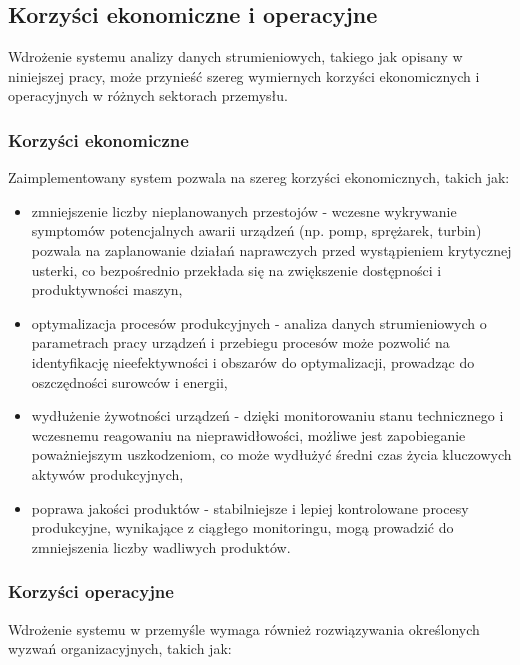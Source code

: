 \subsection{Korzyści ekonomiczne i operacyjne}
\label{subsec:korzysci}

Wdrożenie systemu analizy danych strumieniowych, takiego jak opisany w niniejszej pracy, może przynieść szereg wymiernych korzyści ekonomicznych i operacyjnych w różnych sektorach przemysłu.

\subsubsection{Korzyści ekonomiczne}
\label{subsubsec:korzysci_ekonomiczne}

Zaimplementowany system pozwala na szereg korzyści ekonomicznych, takich jak:

\vspace{0.3em}

\begin{itemize}
    \item zmniejszenie liczby nieplanowanych przestojów - wczesne wykrywanie symptomów potencjalnych awarii urządzeń (np. pomp, sprężarek, turbin) pozwala na zaplanowanie działań naprawczych przed wystąpieniem krytycznej usterki, co bezpośrednio przekłada się na zwiększenie dostępności i produktywności maszyn,
    \item optymalizacja procesów produkcyjnych - analiza danych strumieniowych o parametrach pracy urządzeń i przebiegu procesów może pozwolić na identyfikację nieefektywności i obszarów do optymalizacji, prowadząc do oszczędności surowców i energii,
    \item wydłużenie żywotności urządzeń - dzięki monitorowaniu stanu technicznego i wczesnemu reagowaniu na nieprawidłowości, możliwe jest zapobieganie poważniejszym uszkodzeniom, co może wydłużyć średni czas życia kluczowych aktywów produkcyjnych,
    \item poprawa jakości produktów - stabilniejsze i lepiej kontrolowane procesy produkcyjne, wynikające z ciągłego monitoringu, mogą prowadzić do zmniejszenia liczby wadliwych produktów.
\end{itemize}

\subsubsection{Korzyści operacyjne}
\label{subsubsec:korzysci_operacyjne}

Wdrożenie systemu w przemyśle wymaga również rozwiązywania określonych wyzwań organizacyjnych, takich jak:

